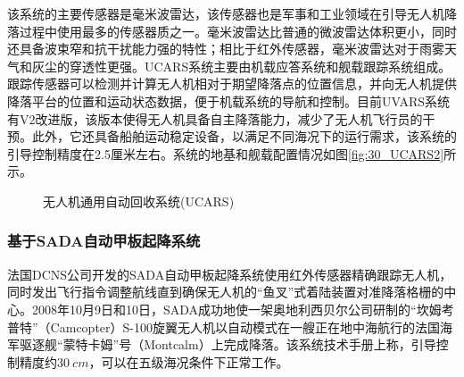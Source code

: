 该系统的主要传感器是毫米波雷达，该传感器也是军事和工业领域在引导无人机降落过程中使用最多的传感器质之一。毫米波雷达比普通的微波雷达体积更小，同时还具备波束窄和抗干扰能力强的特性；相比于红外传感器，毫米波雷达对于雨雾天气和灰尘的穿透性更强。UCARS系统主要由机载应答系统和舰载跟踪系统组成。跟踪传感器可以检测并计算无人机相对于期望降落点的位置信息，并向无人机提供降落平台的位置和运动状态数据，便于机载系统的导航和控制。目前UVARS系统有V2改进版，该版本使得无人机具备自主降落能力，减少了无人机飞行员的干预。此外，它还具备船舶运动稳定设备，以满足不同海况下的运行需求，该系统的引导控制精度在2.5厘米左右。系统的地基和舰载配置情况如图\ref{fig:30_UCARS2}所示。 

\begin{figure}[htb]
	\centering%
	\hspace{1em}%
	\caption{无人机通用自动回收系统(UCARS)}
	\label{fig:29_UCARS}
\end{figure}

\subsubsection{基于SADA自动甲板起降系统}
法国DCNS公司开发的SADA自动甲板起降系统\cite{DCNS}使用红外传感器精确跟踪无人机，同时发出飞行指令调整航线直到确保无人机的“鱼叉”式着陆装置对准降落格栅的中心。2008年10月9日和10日，SADA成功地使一架奥地利西贝尔公司研制的“坎姆考普特”（Camcopter）S-100旋翼无人机以自动模式在一艘正在地中海航行的法国海军驱逐舰“蒙特卡姆”号（Montcalm）上完成降落。该系统技术手册上称，引导控制精度约$30\ cm$，可以在五级海况条件下正常工作。

